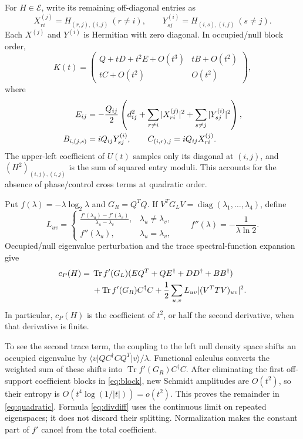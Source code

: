 \documentclass[11pt]{article}
\newcommand{\Tr}{\operatorname{Tr}}
\newcommand{\diag}{\operatorname{diag}}
\newcommand{\cE}{\mathcal E}
\newcommand{\ket}[1]{\lvert#1\rangle}
\newcommand{\bra}[1]{\langle#1\rvert}
\begin{document}
For $H\in\cE$, write its remaining off-diagonal entries as
\begin{equation}\label{eq:controls}
 X^{(j)}_{ri}=H_{(r,j),(i,j)}\ (r\ne i),\qquad
 Y^{(i)}_{sj}=H_{(i,s),(i,j)}\ (s\ne j).
\end{equation}
Each $X^{(j)}$ and $Y^{(i)}$ is Hermitian with zero diagonal. In occupied/null block order,
\begin{equation}\label{eq:block}
 K(t)=\begin{pmatrix}
       Q+tD+t^2E+O(t^3)&tB+O(t^2)\\
       tC+O(t^2)&O(t^2)
       \end{pmatrix},
\end{equation}
where
\begin{align}\label{eq:blocks}
 E_{ij}&=-\frac{Q_{ij}}{2}\left(d_{ij}^2+
           \sum_{r\ne i}|X^{(j)}_{ri}|^2+
           \sum_{s\ne j}|Y^{(i)}_{sj}|^2\right),\notag\\
 B_{i,(j,s)}&=iQ_{ij}Y^{(i)}_{sj},\qquad
 C_{(i,r),j}=iQ_{ij}X^{(j)}_{ri}.
\end{align}
The upper-left coefficient of $U(t)$ samples only its diagonal at $(i,j)$, and $(H^2)_{(i,j),(i,j)}$ is the sum of squared entry moduli. This accounts for the absence of phase/control cross terms at quadratic order.

Put $f(\lambda)=-\lambda\log_2\lambda$ and $G_R=Q^TQ$. If $V^TG_LV=\diag(\lambda_1,\ldots,\lambda_4)$, define
\begin{equation}\label{eq:divdiff}
 L_{uv}=\begin{cases}
 \displaystyle\frac{f'(\lambda_u)-f'(\lambda_v)}{\lambda_u-\lambda_v},
                                  &\lambda_u\ne\lambda_v,\\[6pt]
 f''(\lambda_u),&\lambda_u=\lambda_v,
 \end{cases}
 \qquad f''(\lambda)=-\frac{1}{\lambda\ln2}.
\end{equation}
Occupied/null eigenvalue perturbation and the trace spectral-function expansion give
\begin{align}\label{eq:curvature}
 c_P(H)={}&\Tr f'(G_L)(EQ^T+QE^\dagger+DD^\dagger+BB^\dagger)\notag\\
          &+\Tr f'(G_R)C^\dagger C
           +\frac12\sum_{u,v}L_{uv}|(V^TTV)_{uv}|^2.
\end{align}
In particular, $c_P(H)$ is the coefficient of $t^2$, or half the second derivative, when that derivative is finite.

To see the second trace term, the coupling to the left null density space shifts an occupied eigenvalue by
$\bra{v}QC^\dagger CQ^T\ket{v}/\lambda$. Functional calculus converts the weighted sum of these shifts into $\Tr f'(G_R)C^\dagger C$. After eliminating the first off-support coefficient blocks in \eqref{eq:block}, new Schmidt amplitudes are $O(t^2)$, so their entropy is $O(t^4\log(1/|t|))=o(t^2)$. This proves the remainder in \eqref{eq:quadratic}. Formula \eqref{eq:divdiff} uses the continuous limit on repeated eigenspaces; it does not discard their splitting. Normalization makes the constant part of $f'$ cancel from the total coefficient.
\end{document}
